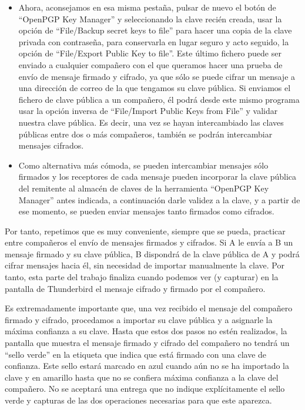 \begin{itemize}[label=\textbullet]
    OpenPGP haciendo uso de la opción ``Seguridad'' de la pantalla de envío de mensajes y
    activando la casilla correspondiente, pero no tendría mucho sentido hacerlo a quién no tenga
    habilitada esta funcionalidad de correo seguro OpenPGP.
    \item Ahora, aconsejamos en esa misma pestaña, pulsar de nuevo el botón de ``OpenPGP Key
    Manager'' y seleccionando la clave recién creada, usar la opción de ``File/Backup secret keys
    to file'' para hacer una copia de la clave privada con contraseña, para conservarla en lugar
    seguro y acto seguido, la opción de ``File/Export Public Key to file''. Este último fichero
    puede ser enviado a cualquier compañero con el que queramos hacer una prueba de envío de
    mensaje firmado y cifrado, ya que sólo se puede cifrar un mensaje a una dirección de correo
    de la que tengamos su clave pública. Si enviamos el fichero de clave pública a un compañero,
    él podrá desde este mismo programa usar la opción inversa de ``File/Import Public Keys
    from File'' y validar nuestra clave pública. Es decir, una vez se hayan intercambiado las
    claves públicas entre dos o más compañeros, también se podrán intercambiar mensajes
    cifrados.
    \item Como alternativa más cómoda, se pueden intercambiar mensajes sólo firmados y los
    receptores de cada mensaje pueden incorporar la clave pública del remitente al almacén de
    claves de la herramienta ``OpenPGP Key Manager'' antes indicada, a continuación darle
    validez a la clave, y a partir de ese momento, se pueden enviar mensajes tanto firmados como
    cifrados.
\end{itemize}

Por tanto, repetimos que es muy conveniente, siempre que se pueda, practicar entre compañeros el
envío de mensajes firmados y cifrados. Si A le envía a B un mensaje firmado y su clave pública, B
dispondrá de la clave pública de A y podrá cifrar mensajes hacia él, sin necesidad de importar
manualmente la clave. Por tanto, esta parte del trabajo finaliza cuando podemos ver (y capturar) en
la pantalla de Thunderbird el mensaje cifrado y firmado por el compañero.

Es extremadamente importante que, una vez recibido el mensaje del compañero firmado y cifrado,
procedamos a importar su clave pública y a asignarle la máxima confianza a su clave. Hasta que
estos dos pasos no estén realizados, la pantalla que muestra el mensaje firmado y cifrado del
compañero no tendrá un ``sello verde'' en la etiqueta que indica que está firmado con una clave de
confianza. Este sello estará marcado en azul cuando aún no se ha importado la clave y en amarillo
hasta que no se confiera máxima confianza a la clave del compañero. No se aceptará una entrega
que no indique explícitamente el sello verde y capturas de las dos operaciones necesarias para que
este aparezca.

